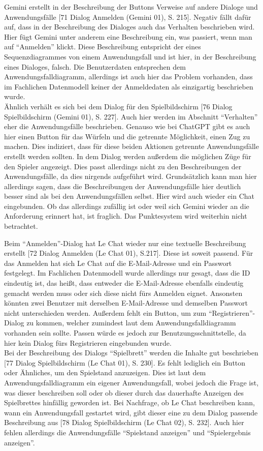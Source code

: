 Gemini erstellt in der Beschreibung der Buttons Verweise auf andere Dialoge und Anwendungsfälle [71 Dialog Anmelden (Gemini 01), S. 215]. Negativ fällt dafür auf, dass in der 
Beschreibung des Dialoges auch das Verhalten beschrieben wird. Hier fügt Gemini unter anderem eine Beschreibung ein, was passiert, wenn man 
auf ``Anmelden'' klickt. Diese Beschreibung entspricht der eines Sequenzdiagrammes von einem Anwendungsfall und ist hier, in der Beschreibung 
eines Dialoges, falsch. Die Benutzerdaten entsprechen dem Anwendungsfalldiagramm, allerdings ist auch hier das Problem vorhanden, dass im 
Fachlichen Datenmodell keiner der Anmeldedaten als einzigartig beschrieben wurde.\\
Ähnlich verhält es sich bei dem Dialog für den Spielbildschirm [76 Dialog Spielbildschirm (Gemini 01), S. 227]. Auch hier werden im Abschnitt ``Verhalten'' eher die Anwendungsfälle beschrieben. 
Genauso wie bei ChatGPT gibt es auch hier einen Button für das Würfeln und die getrennte Möglichkeit, einen Zug zu machen. Dies indiziert, dass 
für diese beiden Aktionen getrennte Anwendungsfälle erstellt werden sollten. In dem Dialog werden außerdem die möglichen Züge für den Spieler 
angezeigt. Dies passt allerdings nicht zu den Beschreibungen der Anwendungsfälle, da dies nirgends aufgeführt wird. Grundsätzlich kann man hier 
allerdings sagen, dass die Beschreibungen der Anwendungsfälle hier deutlich besser sind als bei den Anwendungsfällen selbst. Hier wird auch 
wieder ein Chat eingebunden. Ob das allerdings zufällig ist oder weil sich Gemini wieder an die Anforderung erinnert hat, ist fraglich. Das 
Punktesystem wird weiterhin nicht betrachtet.

Beim ``Anmelden''-Dialog hat Le Chat wieder nur eine textuelle Beschreibung erstellt [72 Dialog Anmelden (Le Chat 01), S.217]. Diese ist soweit passend. Für das Anmelden hat sich Le Chat 
auf die E-Mail-Adresse und ein Passwort festgelegt. Im Fachlichen Datenmodell wurde allerdings nur gesagt, dass die ID eindeutig ist, das 
heißt, dass entweder die E-Mail-Adresse ebenfalls eindeutig gemacht werden muss oder sich diese nicht fürs Anmelden eignet. Ansonsten könnten 
zwei Benutzer mit derselben E-Mail-Adresse und demselben Passwort nicht unterschieden werden. Außerdem fehlt ein Button, um zum 
``Registrieren''-Dialog zu kommen, welcher zumindest laut dem Anwendungsfalldiagramm vorhanden sein sollte. Passen würde es jedoch zur 
Benutzungsschnittstelle, da hier kein Dialog fürs Registrieren eingebunden wurde.\\
Bei der Beschreibung des Dialogs ``Spielbrett'' werden die Inhalte gut beschrieben [77 Dialog Spielbildschirm (Le Chat 01), S. 230]. Es fehlt lediglich ein Button oder Ähnliches, um den 
Spielstand anzuzeigen. Dies ist laut dem Anwendungsfalldiagramm ein eigener Anwendungsfall, wobei jedoch die Frage ist, was dieser beschreiben 
soll oder ob dieser durch das dauerhafte Anzeigen des Spielbrettes hinfällig geworden ist. Bei Nachfrage, ob Le Chat beschreiben kann, wann 
ein Anwendungsfall gestartet wird, gibt dieser eine zu dem Dialog passende Beschreibung aus [78 Dialog Spielbildschirm (Le Chat 02), S. 232]. Auch hier fehlen allerdings die Anwendungsfälle 
``Spielstand anzeigen'' und ``Spielergebnis anzeigen''.

